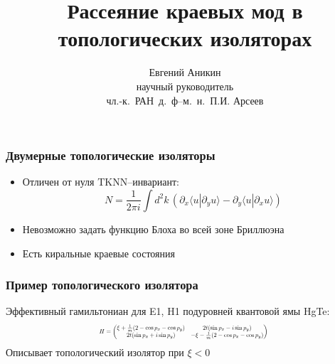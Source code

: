 \documentclass{beamer}
\title{Рассеяние краевых мод в топологических изоляторах}
\author[Е. Аникин]{Евгений Аникин \\
	научный руководитель\\
	чл.-к.~РАН~д.~ф--м.~н.~П.И. Арсеев}
\institute{ФИАН им. Лебедева}
\date{}
\begin{document}
\begin{frame}
    \titlepage
\end{frame}

\begin{frame}
    \frametitle{Двумерные топологические изоляторы}
    \begin{itemize}
        \item Отличен от нуля $\mathrm{TKNN}$--инвариант:
            \begin{equation}
                \label{TKNN}
                N = \frac{1}{2\pi i} 
                    \int d^2 k\, \left(\partial_x \langle u | \partial_y u \rangle -
                    \partial_y \langle u | \partial_x u \rangle \right)
            \end{equation}
        \item Невозможно задать функцию Блоха во всей зоне Бриллюэна
        \item Есть киральные краевые состояния
    \end{itemize}
\end{frame}

\begin{frame}
    \frametitle{Пример топологического изолятора}
        Эффективный гамильтониан для E1, H1 подуровней квантовой ямы HgTe:
        \begin{equation}
           \label{eff_so_ham}
            \scalebox{0.6}{%
            $
            H = \left(\begin{matrix}
                    \xi + \frac{1}{m}(2 - \cos{p_x} - \cos{p_y}) & 
                            2t(\sin{p_x} - i\sin{p_y})   \\
                    2t(\sin{p_x} + i\sin{p_y}) & 
                           - \xi - \frac{1}{m}(2 - \cos{p_x} - \cos{p_y}) \\
                \end{matrix}\right)
            $
            }
        \end{equation}
        Описывает топологический изолятор при $\xi < 0$
\end{frame}
\end{document}
